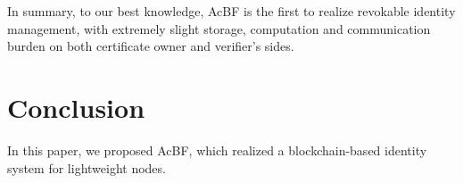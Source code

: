 \documentclass[conference]{IEEEtran}
\begin{document}
In summary, to our best knowledge, AcBF is the first to realize revokable identity management, with extremely slight storage, computation and communication burden on both certificate owner and verifier's sides.


\section{Conclusion}\label{sec:conclusion}
In this paper, we proposed AcBF, which realized a blockchain-based identity system for lightweight nodes.  

\balance


\end{document}
